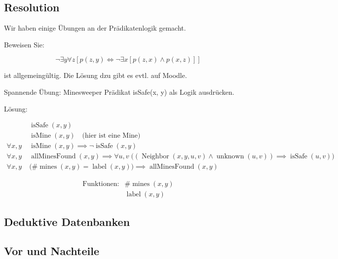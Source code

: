 \documentclass[a4paper]{article}
\begin{document}
\subsection{Resolution}

Wir haben einige Übungen an der Prädikatenlogik gemacht.

Beweisen Sie: 


\begin{equation}
    \neg\exists y \forall z[p(z,y) \iff \neg\exists x[p(z,x) \land p(x,z)]] 
\end{equation}

ist allgemeingültig. Die Lösung dzu gibt es evtl. auf Moodle.

Spannende Übung: Minesweeper Prädikat isSafe(x, y) als Logik ausdrücken.

Lösung:

\begin{align*}
    & \operatorname{isSafe}(x, y)\\
    & \operatorname{isMine}(x, y) \quad \text{(hier ist eine Mine)}\\
    \forall x,y\; & \operatorname{isMine}(x, y) \implies \neg\operatorname{isSafe}(x, y)\\
    \forall x,y\; & \operatorname{allMinesFound}(x, y) \implies
        \forall u,v\; \bigl((\operatorname{Neighbor}(x, y, u, v) \land
        \operatorname{unknown}(u, v)) \implies \operatorname{isSafe}(u, v)\bigr)\\
    \forall x,y\; & \bigl(\#\operatorname{mines}(x, y) =
        \operatorname{label}(x, y)\bigr) \implies \operatorname{allMinesFound}(x, y)
\end{align*}

\begin{align*}
    \text{Funktionen:} & \#\operatorname{mines}(x, y)\\
    & \operatorname{label}(x, y)
\end{align*}


\subsection{Deduktive Datenbanken}

\subsection{Vor und Nachteile}
\end{document}
